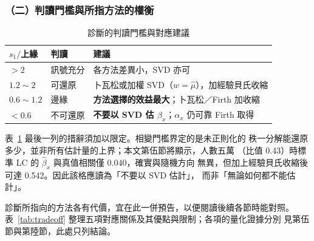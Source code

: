 \documentclass[UTF8, fontset=macnew, a4paper, 12pt]{ctexart}
\newcommand{\cn}[1]{\ding{\number\numexpr171+#1\relax}}
\begin{document}
\subsubsection{（二）判讀門檻與所指方法的權衡}

\begin{table}[H]
  \centering
  \caption{診斷\cn{4}的判讀門檻與對應建議}
  \label{tab:edarule}
  \small
  \begin{tabular}{llp{7.6cm}}
    \toprule
    $s_1/$上緣 & 判讀 & 建議 \\
    \midrule
    $>2$        & 訊號充分 & 各方法差異小，SVD 亦可 \\
    $1.2\sim2$  & 可還原   & 卜瓦松或加權 SVD（$w=\hat\mu$），加經驗貝氏收縮 \\
    $0.6\sim1.2$& 邊緣     & \textbf{方法選擇的效益最大}；卜瓦松／Firth 加收縮 \\
    $<0.6$      & 不可還原 & \textbf{不要以 SVD 估 $\beta_x$}；$\alpha_x$ 仍可靠 Firth 取得 \\
    \bottomrule
  \end{tabular}
\end{table}

表~\ref{tab:edarule} 最後一列的措辭須加以限定。相變門檻界定的是未正則化的
秩一分解能還原多少，並非所有估計量的上界；本文第伍節將顯示，人數五萬
（比值 0.43）時標準 LC 的 $\hat\beta_x$ 與真值相關僅 0.040，確實與隨機方向
無異，但加上經驗貝氏收縮後可達 0.542。因此該格應讀為「不要以 SVD 估計」，
而非「無論如何都不能估計」。

診斷所指向的方法各有代價，宜在此一併預告，以便閱讀後續各節時能對照。
表~\ref{tab:tradeoff} 整理五項對應關係及其優點與限制；各項的量化證據分別
見第伍節與第陸節，此處只列結論。
\end{document}
